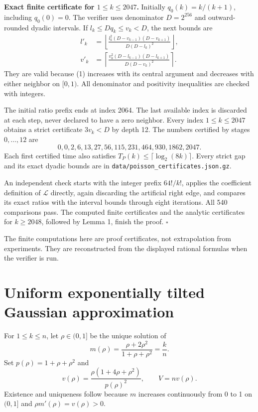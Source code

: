 \documentclass[11pt,a4paper]{article}
\begin{document}
\textbf{Exact finite certificate for \(1\leq k\leq2047\).} Initially
\(q_0(k)=k/(k+1)\), including \(q_0(0)=0\). The verifier uses
denominator \(D=2^{256}\) and outward-rounded dyadic intervals. If
\(l_k\leq Dq_k\leq v_k<D\), the next bounds are \[
\begin{split}
 l'_k&=\left\lfloor
 \frac{l_k^2(D-v_{k-1})(D-v_{k+1})}{D(D-l_k)^2}
 \right\rfloor,\\
 v'_k&=\left\lceil
 \frac{v_k^2(D-l_{k-1})(D-l_{k+1})}{D(D-v_k)^2}
 \right\rceil.
\end{split} \tag{11}
\] They are valid because (1) increases with its central argument and
decreases with either neighbor on \([0,1)\). All denominator and
positivity inequalities are checked with integers.

The initial ratio prefix ends at index 2064. The last available index is
discarded at each step, never declared to have a zero neighbor. Every
index \(1\leq k\leq2047\) obtains a strict certificate \(3v_k<D\) by
depth 12. The numbers certified by stages \(0,\ldots,12\) are \[
 0,0,2,6,13,27,56,115,231,464,930,1862,2047.
\] Each first certified time also satisfies
\(T_P(k)\leq\lceil\log_2(8k)\rceil\). Every strict gap and its exact
dyadic bounds are in \texttt{data/poisson\_certificates.json.gz}.

An independent check starts with the integer prefix \(64!/k!\), applies
the coefficient definition of \(\mathcal L\) directly, again discarding
the artificial right edge, and compares its exact ratios with the
interval bounds through eight iterations. All 540 comparisons pass. The
computed finite certificates and the analytic certificates for
\(k\geq2048\), followed by Lemma 1, finish the proof. \(\square\)

The finite computations here are proof certificates, not extrapolation
from experiments. They are reconstructed from the displayed rational
formulas when the verifier is run.

\section{Uniform exponentially tilted Gaussian approximation}\label{uniform-exponentially-tilted-gaussian-approximation}


For \(1\leq k\leq n\), let \(\rho\in(0,1]\) be the unique solution of \[
 m(\rho)=\frac{\rho+2\rho^2}{1+\rho+\rho^2}=\frac{k}{n}.
\] Set \(p(\rho)=1+\rho+\rho^2\) and \[
 v(\rho)=\frac{\rho(1+4\rho+\rho^2)}{p(\rho)^2},\qquad V=nv(\rho).
\] Existence and uniqueness follow because \(m\) increases continuously
from 0 to 1 on \((0,1]\) and \(\rho m'(\rho)=v(\rho)>0\).
\end{document}
